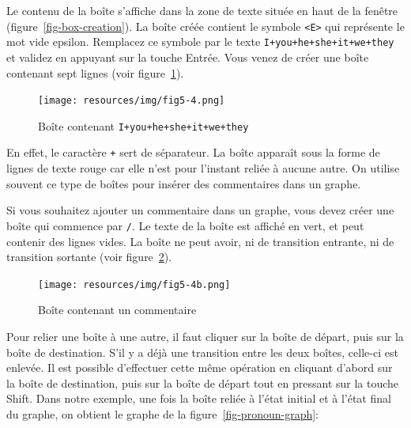 \bigskip
\noindent Le contenu de la boîte s’affiche dans la zone de texte située en
haut de la fenêtre (figure~\ref{fig-box-creation}).
La boîte créée contient le symbole \verb+<E>+ qui représente
le mot vide epsilon. Remplacez ce symbole par le texte \verb$I+you+he+she+it+we+they$ et validez en
appuyant sur la touche Entrée. Vous venez de créer une boîte contenant sept lignes (voir
	figure~\ref{fig-pronoun-box}).

\begin{figure}[!ht]
\begin{center}
\texttt{[image: resources/img/fig5-4.png]}
\caption{Boîte contenant
\texttt{I+you+he+she+it+we+they}\label{fig-pronoun-box}}
\end{center}
\end{figure}

\bigskip
\noindent En effet, le caractère \verb$+$ sert de séparateur.\index{\verbc{+}} La boîte apparaît sous la
forme de lignes de texte rouge car elle n’est pour l’instant reliée à aucune autre.
On utilise souvent ce type de boîtes pour insérer des commentaires dans un graphe.

\bigskip
\noindent Si vous souhaitez ajouter un commentaire dans un graphe, vous devez créer une boîte qui
commence par \verb$/$. Le texte de la boîte est affiché en vert, et peut contenir des lignes vides.
La boîte ne peut avoir, ni de transition entrante, ni de transition sortante (voir
figure~\ref{comment-box}).

\begin{figure}[!ht]
\begin{center}
\texttt{[image: resources/img/fig5-4b.png]}
\caption{Boîte contenant un commentaire\label{comment-box}}
\end{center}
\end{figure}

\bigskip
\noindent Pour relier une boîte à une autre, il faut cliquer sur la boîte de départ, puis sur la
boîte de destination.
S’il y a déjà une transition entre les deux boîtes, celle-ci est enlevée. Il est possible
d’effectuer cette même opération en cliquant d’abord sur la boîte de destination, puis sur la boîte
de départ tout en pressant sur la touche Shift.
Dans notre exemple, une fois la boîte reliée à l’état initial et à l’état final du graphe,
on obtient le graphe de la figure~\ref{fig-pronoun-graph}:

